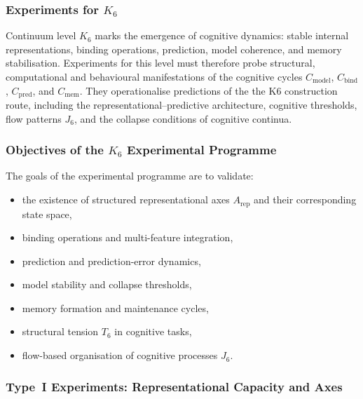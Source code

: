 
\subsubsection{Experiments for \texorpdfstring{$K_6$}{K_6}}
\label{sec:experiments-k6}

Continuum level $K_6$ marks the emergence of cognitive dynamics:
stable internal representations, binding operations, prediction,
model coherence, and memory stabilisation.  
Experiments for this level must therefore probe structural,
computational and behavioural manifestations of the cognitive
cycles $C_{\mathrm{model}}$, $C_{\mathrm{bind}}$,
$C_{\mathrm{pred}}$, and $C_{\mathrm{mem}}$.
They operationalise predictions of the the K6 construction route, including
the representational–predictive architecture, cognitive thresholds,
flow patterns $J_6$, and the collapse conditions of cognitive continua.



\subsubsection{Objectives of the \texorpdfstring{$K_6$}{K_6} Experimental Programme}

The goals of the experimental programme are to validate:

\begin{itemize}
    \item the existence of structured representational axes 
          $A_{\mathrm{rep}}$ and their corresponding state space,
    \item binding operations and multi-feature integration,
    \item prediction and prediction-error dynamics,
    \item model stability and collapse thresholds,
    \item memory formation and maintenance cycles,
    \item structural tension $T_6$ in cognitive tasks,
    \item flow-based organisation of cognitive processes $J_6$.
\end{itemize}



\subsubsection{Type~I Experiments: Representational Capacity and Axes}


